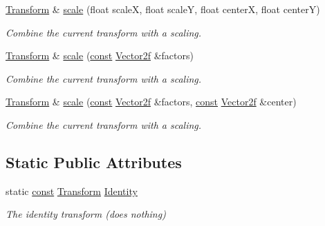 \begin{DoxyCompactItemize}
\hyperlink{classsf_1_1_transform}{Transform} \& \hyperlink{classsf_1_1_transform_a6eaeedd35e289cb17f9bf7f24dc28daa}{scale} (float scale\-X, float scale\-Y, float center\-X, float center\-Y)
\begin{DoxyCompactList}\small\item\em Combine the current transform with a scaling. \end{DoxyCompactList}\item 
\hyperlink{classsf_1_1_transform}{Transform} \& \hyperlink{classsf_1_1_transform_a3d57622a7ab309925c9d9887c99cc720}{scale} (\hyperlink{term__entry_8h_a57bd63ce7f9a353488880e3de6692d5a}{const} \hyperlink{namespacesf_a80cea3c46537294fd1d8d428566ad8b2}{Vector2f} \&factors)
\begin{DoxyCompactList}\small\item\em Combine the current transform with a scaling. \end{DoxyCompactList}\item 
\hyperlink{classsf_1_1_transform}{Transform} \& \hyperlink{classsf_1_1_transform_a9198da375173127901f3095e0165ee1b}{scale} (\hyperlink{term__entry_8h_a57bd63ce7f9a353488880e3de6692d5a}{const} \hyperlink{namespacesf_a80cea3c46537294fd1d8d428566ad8b2}{Vector2f} \&factors, \hyperlink{term__entry_8h_a57bd63ce7f9a353488880e3de6692d5a}{const} \hyperlink{namespacesf_a80cea3c46537294fd1d8d428566ad8b2}{Vector2f} \&center)
\begin{DoxyCompactList}\small\item\em Combine the current transform with a scaling. \end{DoxyCompactList}\end{DoxyCompactItemize}
\subsection*{Static Public Attributes}
\begin{DoxyCompactItemize}
\item 
static \hyperlink{term__entry_8h_a57bd63ce7f9a353488880e3de6692d5a}{const} \hyperlink{classsf_1_1_transform}{Transform} \hyperlink{classsf_1_1_transform_a854729912a691efeca9f213c54be4f59}{Identity}
\begin{DoxyCompactList}\small\item\em The identity transform (does nothing) \end{DoxyCompactList}\end{DoxyCompactItemize}
